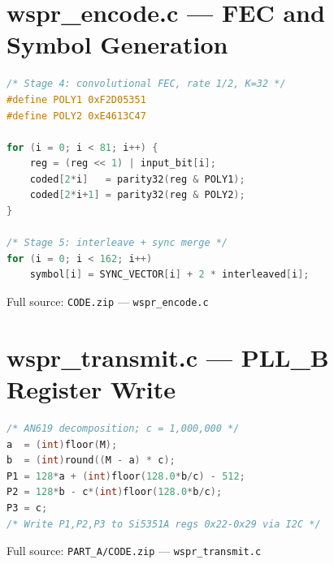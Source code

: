 \documentclass[conference]{IEEEtran}
\begin{document}
\section{wspr\_encode.c --- FEC and Symbol Generation}
\label{app:encode}

\begin{lstlisting}[style=cstyle,language=C]
/* Stage 4: convolutional FEC, rate 1/2, K=32 */
#define POLY1 0xF2D05351
#define POLY2 0xE4613C47

for (i = 0; i < 81; i++) {
    reg = (reg << 1) | input_bit[i];
    coded[2*i]   = parity32(reg & POLY1);
    coded[2*i+1] = parity32(reg & POLY2);
}

/* Stage 5: interleave + sync merge */
for (i = 0; i < 162; i++)
    symbol[i] = SYNC_VECTOR[i] + 2 * interleaved[i];
\end{lstlisting}

Full source: \texttt{CODE.zip} --- \texttt{wspr\_encode.c}

\section{wspr\_transmit.c --- PLL\_B Register Write}
\label{app:transmit}

\begin{lstlisting}[style=cstyle,language=C]
/* AN619 decomposition; c = 1,000,000 */
a  = (int)floor(M);
b  = (int)round((M - a) * c);
P1 = 128*a + (int)floor(128.0*b/c) - 512;
P2 = 128*b - c*(int)floor(128.0*b/c);
P3 = c;
/* Write P1,P2,P3 to Si5351A regs 0x22-0x29 via I2C */
\end{lstlisting}

Full source: \texttt{PART\_A/CODE.zip} --- \texttt{wspr\_transmit.c}
\end{document}
